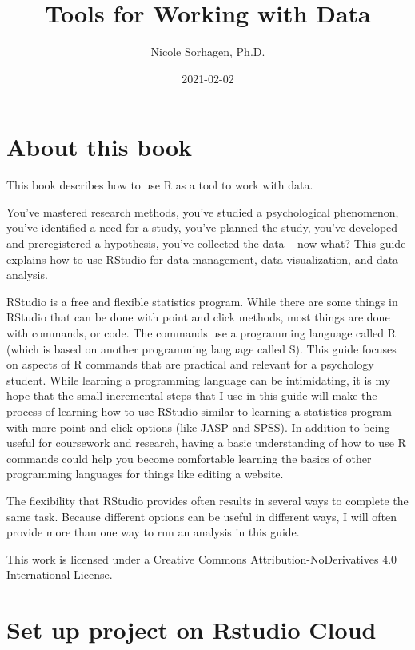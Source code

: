 \documentclass[
]{book}
\title{Tools for Working with Data}
\author{Nicole Sorhagen, Ph.D.}
\date{2021-02-02}
\begin{document}
\maketitle

{
\setcounter{tocdepth}{1}
\tableofcontents
}
\hypertarget{about-this-book}{%
\chapter{About this book}\label{about-this-book}}

This book describes how to use R as a tool to work with data.

You've mastered research methods, you've studied a psychological phenomenon, you've identified a need for a study, you've planned the study, you've developed and preregistered a hypothesis, you've collected the data -- now what? This guide explains how to use RStudio for data management, data visualization, and data analysis.

RStudio is a free and flexible statistics program. While there are some things in RStudio that can be done with point and click methods, most things are done with commands, or code. The commands use a programming language called R (which is based on another programming language called S). This guide focuses on aspects of R commands that are practical and relevant for a psychology student. While learning a programming language can be intimidating, it is my hope that the small incremental steps that I use in this guide will make the process of learning how to use RStudio similar to learning a statistics program with more point and click options (like JASP and SPSS). In addition to being useful for coursework and research, having a basic understanding of how to use R commands could help you become comfortable learning the basics of other programming languages for things like editing a website.

The flexibility that RStudio provides often results in several ways to complete the same task. Because different options can be useful in different ways, I will often provide more than one way to run an analysis in this guide.

This work is licensed under a Creative Commons Attribution-NoDerivatives 4.0 International License.

\hypertarget{set-up-project-on-rstudio-cloud}{%
\chapter{Set up project on Rstudio Cloud}\label{set-up-project-on-rstudio-cloud}}
\end{document}
